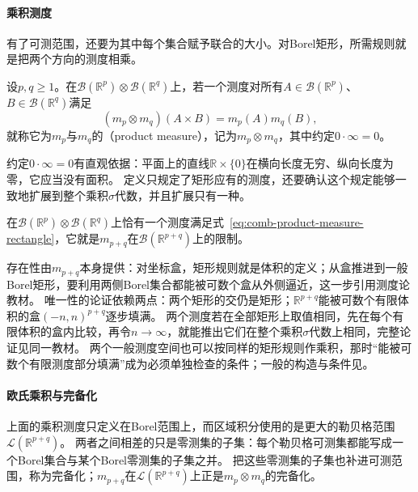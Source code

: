 \paragraph{乘积测度}

有了可测范围，还要为其中每个集合赋予联合的大小。对Borel矩形，所需规则就是把两个方向的测度相乘。

\begin{definition}[乘积测度]
\label{def:analysis-product-measure}
设$p,q\geq1$。在$\mathcal B(\mathbb R^p)\otimes\mathcal B(\mathbb R^q)$上，若一个测度对所有$A\in\mathcal B(\mathbb R^p)$、$B\in\mathcal B(\mathbb R^q)$满足
\begin{equation}
 (m_p\otimes m_q)(A\times B)=m_p(A)m_q(B),
 \label{eq:comb-product-measure-rectangle}
\end{equation}
就称它为$m_p$与$m_q$的（product measure），记为$m_p\otimes m_q$，其中约定$0\cdot\infty=0$。
\end{definition}

约定$0\cdot\infty=0$有直观依据：平面上的直线$\mathbb R\times\{0\}$在横向长度无穷、纵向长度为零，它应当没有面积。
定义只规定了矩形应有的测度，还要确认这个规定能够一致地扩展到整个乘积$\sigma$代数，并且扩展只有一种。

\begin{theorem}[乘积测度的存在唯一性]
在$\mathcal B(\mathbb R^p)\otimes\mathcal B(\mathbb R^q)$上恰有一个测度满足式~\eqref{eq:comb-product-measure-rectangle}，它就是$m_{p+q}$在$\mathcal B(\mathbb R^{p+q})$上的限制。
\end{theorem}

存在性由$m_{p+q}$本身提供：对坐标盒，矩形规则就是体积的定义；从盒推进到一般Borel矩形，要利用两侧Borel集合都能被可数个盒从外侧逼近，这一步引用测度论教材。
唯一性的论证依赖两点：两个矩形的交仍是矩形；$\mathbb R^{p+q}$能被可数个有限体积的盒$(-n,n)^{p+q}$逐步填满。
两个测度若在全部矩形上取值相同，先在每个有限体积的盒内比较，再令$n\to\infty$，就能推出它们在整个乘积$\sigma$代数上相同，完整论证见同一教材。
两个一般测度空间也可以按同样的矩形规则作乘积，那时“能被可数个有限测度部分填满”成为必须单独检查的条件；一般的构造与条件见。

\paragraph{欧氏乘积与完备化}

上面的乘积测度只定义在Borel范围上，而区域积分使用的是更大的勒贝格范围$\mathcal L(\mathbb R^{p+q})$。
两者之间相差的只是零测集的子集：每个勒贝格可测集都能写成一个Borel集合与某个Borel零测集的子集之并。
把这些零测集的子集也补进可测范围，称为完备化；$m_{p+q}$在$\mathcal L(\mathbb R^{p+q})$上正是$m_p\otimes m_q$的完备化。

